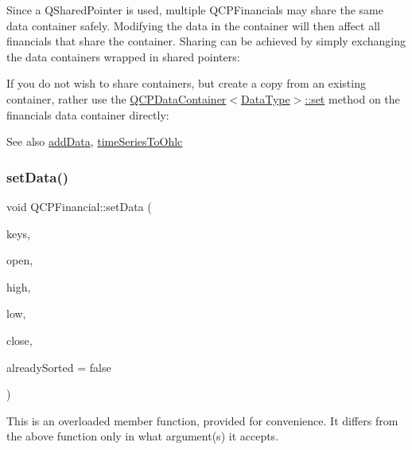 Since a Q\+Shared\+Pointer is used, multiple Q\+C\+P\+Financials may share the same data container safely. Modifying the data in the container will then affect all financials that share the container. Sharing can be achieved by simply exchanging the data containers wrapped in shared pointers\+: 
\begin{DoxyCodeInclude}
\end{DoxyCodeInclude}
 If you do not wish to share containers, but create a copy from an existing container, rather use the \hyperlink{class_q_c_p_data_container_ae7042bd534fc3ce7befa2ce3f790b5bf}{Q\+C\+P\+Data\+Container$<$\+Data\+Type$>$\+::set} method on the financial\textquotesingle{}s data container directly\+: 
\begin{DoxyCodeInclude}
\end{DoxyCodeInclude}
 \begin{DoxySeeAlso}{See also}
\hyperlink{class_q_c_p_financial_a372ac031e44a7a6c912d203556af96f7}{add\+Data}, \hyperlink{class_q_c_p_financial_a9a058c035040d3939b8884f4aaccb1a7}{time\+Series\+To\+Ohlc} 
\end{DoxySeeAlso}
\mbox{\label{class_q_c_p_financial_a12992e669ed19d7bb48dbe601570cc05}} 
\subsubsection{\texorpdfstring{set\+Data()}{setData()}\hspace{0.1cm}{\footnotesize\ttfamily [2/2]}}
{\footnotesize\ttfamily void Q\+C\+P\+Financial\+::set\+Data (\begin{DoxyParamCaption}\item[{const Q\+Vector$<$ double $>$ \&}]{keys,  }\item[{const Q\+Vector$<$ double $>$ \&}]{open,  }\item[{const Q\+Vector$<$ double $>$ \&}]{high,  }\item[{const Q\+Vector$<$ double $>$ \&}]{low,  }\item[{const Q\+Vector$<$ double $>$ \&}]{close,  }\item[{bool}]{already\+Sorted = {\ttfamily false} }\end{DoxyParamCaption})}

This is an overloaded member function, provided for convenience. It differs from the above function only in what argument(s) it accepts.

